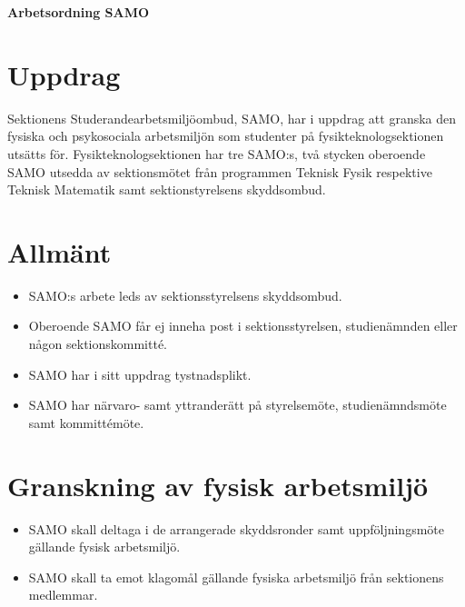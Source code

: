 

\renewcommand{\dateseparator}{-} %

\renewcommand{\forening}{SAMO}

\begin{center}
\LARGE{\textbf{Arbetsordning \forening}}
\end{center}



\section{Uppdrag}
Sektionens Studerandearbetsmiljöombud, SAMO, har i uppdrag att granska den fysiska och psykosociala arbetsmiljön som studenter på fysikteknologsektionen utsätts för.
Fysikteknologsektionen har tre SAMO:s, två stycken oberoende SAMO utsedda av sektionsmötet från programmen Teknisk Fysik respektive Teknisk Matematik samt sektionstyrelsens skyddsombud.

\section{Allmänt}
\begin{itemize}
\item SAMO:s arbete leds av sektionsstyrelsens skyddsombud.
\item Oberoende SAMO får ej inneha post i sektionsstyrelsen, studienämnden eller någon sektionskommitté.

\item SAMO har i sitt uppdrag tystnadsplikt.

\item SAMO har närvaro- samt yttranderätt på styrelsemöte, studienämndsmöte samt kommittémöte.

\end{itemize}

\section{Granskning av fysisk arbetsmiljö}
\begin{itemize}
\item SAMO skall deltaga i de arrangerade skyddsronder samt uppföljningsmöte gällande fysisk arbetsmiljö.

\item SAMO skall ta emot klagomål gällande fysiska arbetsmiljö från sektionens medlemmar.

\end{itemize}



